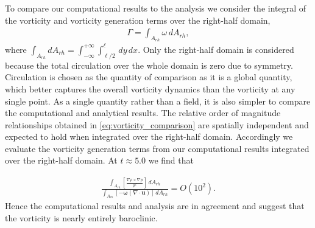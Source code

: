 \documentclass{jfm}%
\newcommand{\orderof}[1]{\ensuremath{\textit{O}\left(#1\right)}}
\begin{document}
To compare our computational results to the analysis we consider the
integral of the vorticity and vorticity generation terms over the
right-half domain,
\begin{align}
  \Gamma = \int_{A_{rh}} \omega \,dA_{rh},
\end{align}
where $\int_{A_{rh}} dA_{rh} =
\int_{-\infty}^{+\infty}\int_{\ell/2}^{\ell} \,dy\, dx$. Only the
right-half domain is considered because the total circulation over the
whole domain is zero due to symmetry. Circulation is chosen as the
quantity of comparison as it is a global quantity, which better
captures the overall vorticity dynamics than the vorticity at any
single point. As a single quantity rather than a field, it is also
simpler to compare the computational and analytical results. The
relative order of magnitude relationships obtained in
\eqref{eq:vorticity_comparison} are spatially independent and expected
to hold when integrated over the right-half domain. Accordingly we
evaluate the vorticity generation terms from our computational results
integrated over the right-half domain. At $t\approx5.0$ we find that %
\begin{comment}
  $$ \int_{A_{rh}} \left[\frac{\nabla\rho\times\nabla p}{\rho^2}\right]\,dA_{rh} / \int_{A_{rh}}\left[\left(\boldsymbol{u}\cdot\nabla\right)\boldsymbol{\omega}\right]\,dA_{rh}\approx 285=\orderof{10^2}$$
  and
\end{comment}
\begin{align}
  \frac{\int_{A_{rh}} \left[\frac{\nabla\rho\times\nabla p}{\rho^2}\right]\,dA_{rh}}%
  {\int_{A_{rh}} \left[-\boldsymbol{\omega}\left(\nabla\cdot\boldsymbol{u}\right)\right]%
  \,dA_{rh}}%
  =\orderof{10^2}.
\end{align}
% 
Hence the computational results and analysis are in agreement and
suggest that the vorticity is nearly entirely baroclinic.
% 

 



\end{document}
